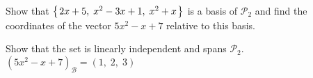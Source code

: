 
\begin{Exercise}[
name={},
title={}, 
difficulty=0,
origin={\cite{BS}}]
Show that $\mbox{$\left\{\hspace{0.1em}2x + 5,\; x^2 - 3x + 1,\; x^2 + x\hspace{0.1em}\right\}$}$ is a basis of $\mathcal{P}_2$ and find the coordinates of
the vector $5x^2 - x + 7$ relative to this basis.
\end{Exercise}
\begin{Answer}
Show that the set is linearly independent and spans $\mathcal{P}_2$.  $\left(5x^2 - x + 7\right)_\mathcal{B}=(1,\;2,\;3)$
\end{Answer}
